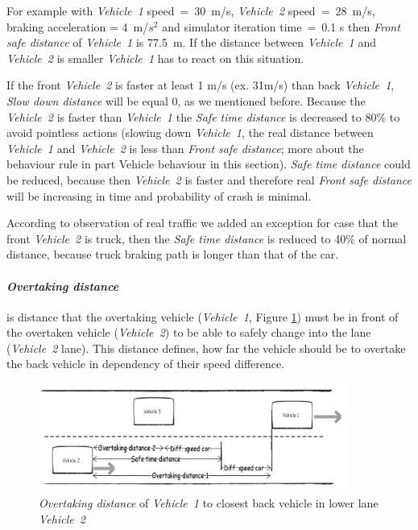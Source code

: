 For example with \textit{\mbox{Vehicle 1}} \mbox{speed  = 30 m/s},  \textit{\mbox{Vehicle 2}} \mbox{speed = 28 m/s}, braking acceleration = \mbox{4 m/$s^2$} and simulator iteration \mbox{time = 0.1} s then \textit{Front safe distance} of \textit{\mbox{Vehicle 1}}  is \mbox{77.5 m}. If the distance between \textit{\mbox{Vehicle 1}} and \textit{\mbox{Vehicle 2}} is smaller \textit{\mbox{Vehicle 1}} has to react on this situation.

If the front \textit{\mbox{Vehicle 2}} is faster at least 1 m/s (ex. 31m/s) than back \textit{\mbox{Vehicle 1}}, \textit{Slow down distance} will be equal 0, as we mentioned before. Because the \textit{\mbox{Vehicle 2}}  is faster than \textit{\mbox{Vehicle 1}} the \textit{Safe time distance} is decreased to 80\% to avoid pointless actions (slowing down \textit{\mbox{Vehicle 1}}, the real distance between \textit{\mbox{Vehicle 1}} and \textit{\mbox{Vehicle 2}}   is less than \textit{Front safe distance}; more about the behaviour rule in part Vehicle behaviour in this section).  \textit{Safe time distance} could be reduced, because then \textit{\mbox{Vehicle 2}} is faster and therefore real \textit{Front safe distance} will be increasing in time and probability of crash is minimal.

According to observation of real traffic we added an exception for case that the front \textit{\mbox{Vehicle 2}} is truck, then the \textit{Safe time distance} is reduced to 40\% of normal distance, because truck braking path is longer than that of the car.

\paragraph{\textit{Overtaking distance}}

is distance that the overtaking vehicle (\textit{\mbox{Vehicle 1}}, Figure \ref{fig:4_2_3_3-2}) must be in front of the overtaken vehicle (\textit{\mbox{Vehicle 2}}) to be able to safely change into the lane (\textit{\mbox{Vehicle 2}} lane). This distance defines, how far the vehicle should be to overtake the back vehicle in dependency of their speed difference.

\begin{figure}[ph]
\centering
\includegraphics[width=0.90\textwidth,height=0.90\textheight,keepaspectratio]{figures/Chapter_4/4_overtaking_distance.png}
\centering
\protect\caption{\label{fig:4_2_3_3-2}\textit{Overtaking distance} of \textit{\mbox{Vehicle 1}} to closest back vehicle in lower lane \textit{\mbox{Vehicle 2}}}
\end{figure}

